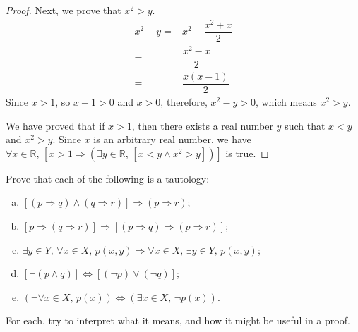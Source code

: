 \begin{solutions*}
\begin{proof}
        Next, we prove that $x^2 > y$.
        \begin{align*}
            x^2 - y =& x^2 - \dfrac{x^2 + x}{2}\\
            =& \dfrac{x^2 - x}{2}\\
            =& \dfrac{x(x-1)}{2}
        \end{align*}
        Since $x > 1$, so $x-1 > 0$ and $x > 0$, therefore, $x^2-y > 0$, which means $x^2 > y$.

        We have proved that if $x > 1$, then there exists a real number $y$ such that $x < y$ and $x^2 > y$. Since $x$ is an arbitrary real number, we have $\forall x \in \mathbb{R},\, [x > 1 \Rightarrow (\exists y \in \mathbb{R},\, [x < y \wedge x^2 > y])]$ is true.
    \end{proof}
\end{solutions*}


\begin{exercise}
\label{exTautologies}
Prove that each of the following is a tautology:
\begin{enumerate}[(a)]
\item $[(p \Rightarrow q) \wedge (q \Rightarrow r)] \Rightarrow (p \Rightarrow r)$;
\item $[p \Rightarrow (q \Rightarrow r)] \Rightarrow [(p \Rightarrow q) \Rightarrow (p \Rightarrow r)]$;
\item $\exists y \in Y,\, \forall x \in X,\, p(x,y) \Rightarrow \forall x \in X,\, \exists y \in Y,\, p(x,y)$;
\item $[\neg (p \wedge q)] \Leftrightarrow [(\neg p) \vee (\neg q)]$;
\item $(\neg \forall x \in X,\, p(x)) \Leftrightarrow (\exists x \in X,\, \neg p(x))$.
\end{enumerate}
For each, try to interpret what it means, and how it might be useful in a proof.
\end{exercise}


